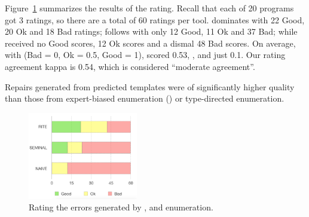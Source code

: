%
Figure~\ref{fig:comparison} summarizes the results of the rating.
%
Recall that each of 20 programs got 3 ratings, so there are a
total of 60 ratings per tool.
%
\toolname dominates with 22 Good, 20 Ok and 18 Bad ratings;
\seminal follows with only 12 Good, 11 Ok and 37 Bad; while
\naive received no Good scores, 12 Ok scores and a
dismal 48 Bad scores.
%
On average, with (Bad = 0, Ok = 0.5, Good = 1),
\toolname scored 0.53, , and \naive
just 0.1.
%
Our rating agreement kappa is 0.54, which is considered ``moderate agreement''.

\begin{framed}
  \noindent Repairs generated from predicted
  templates were of significantly higher quality
  than those from expert-biased enumeration (\seminal)
  or \naive type-directed enumeration.
\end{framed}

\begin{figure}[t]
  \centering
  \includegraphics[height=1.5in]{comparison.png}
  \caption{Rating the errors generated by \toolname, \seminal and \naive enumeration.}
  \label{fig:comparison}
\end{figure}
